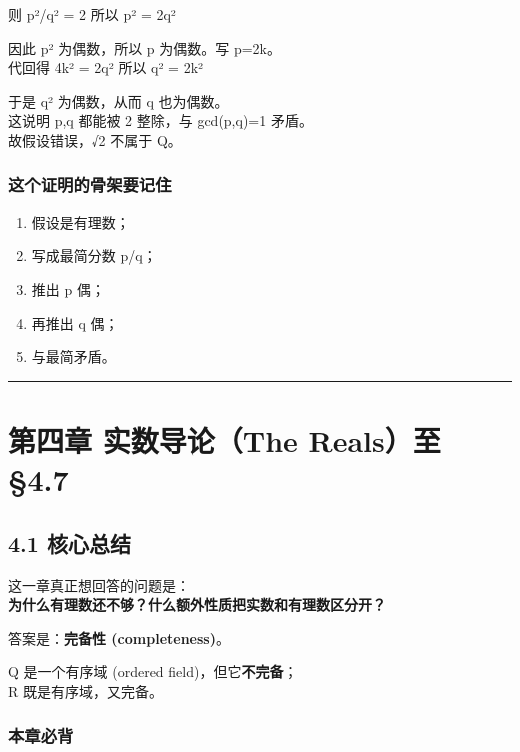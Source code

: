 \documentclass[
  11pt,
]{article}
\providecommand{\tightlist}{%
  \setlength{\itemsep}{0pt}\setlength{\parskip}{0pt}}
\begin{document}
则 p²/q² = 2 所以 p² = 2q²

因此 p² 为偶数，所以 p 为偶数。写 p=2k。\\
代回得 4k² = 2q² 所以 q² = 2k²

于是 q² 为偶数，从而 q 也为偶数。\\
这说明 p,q 都能被 2 整除，与 gcd(p,q)=1 矛盾。\\
故假设错误，√2 不属于 Q。

\subsubsection{这个证明的骨架要记住}\label{ux8fd9ux4e2aux8bc1ux660eux7684ux9aa8ux67b6ux8981ux8bb0ux4f4f}

\begin{enumerate}
\def\labelenumi{\arabic{enumi}.}
\tightlist
\item
  假设是有理数；
\item
  写成最简分数 p/q；
\item
  推出 p 偶；
\item
  再推出 q 偶；
\item
  与最简矛盾。
\end{enumerate}

\begin{center}\rule{0.5\linewidth}{0.5pt}\end{center}

\section{第四章 实数导论（The Reals）至
§4.7}\label{ux7b2cux56dbux7ae0-ux5b9eux6570ux5bfcux8bbathe-realsux81f3-4.7}

\subsection{4.1 核心总结}\label{ux6838ux5fc3ux603bux7ed3-3}

这一章真正想回答的问题是：\\
\textbf{为什么有理数还不够？什么额外性质把实数和有理数区分开？}

答案是：\textbf{完备性 (completeness)}。

Q 是一个有序域 (ordered field)，但它\textbf{不完备}；\\
R 既是有序域，又完备。

\subsubsection{本章必背}\label{ux672cux7ae0ux5fc5ux80cc-2}
\end{document}
